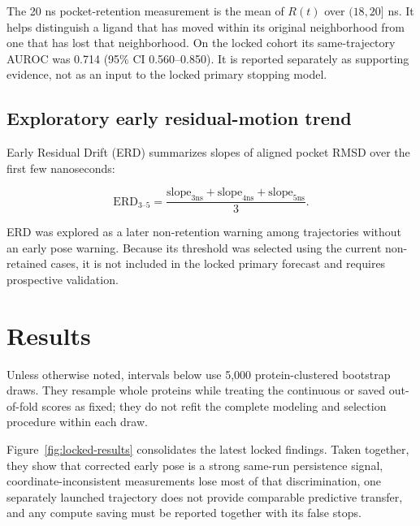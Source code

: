 \documentclass[11pt]{article}
\begin{document}
The 20 ns pocket-retention measurement is the mean of $R(t)$ over $(18,20]$ ns. It helps distinguish a ligand that has moved within its original neighborhood from one that has lost that neighborhood. On the locked cohort its same-trajectory AUROC was 0.714 (95\% CI 0.560--0.850). It is reported separately as supporting evidence, not as an input to the locked primary stopping model.

\subsection{Exploratory early residual-motion trend}

Early Residual Drift (ERD) summarizes slopes of aligned pocket RMSD over the first few nanoseconds:

\begin{equation}
\mathrm{ERD}_{3\text{--}5}=\frac{\mathrm{slope}_{3\mathrm{ns}}+\mathrm{slope}_{4\mathrm{ns}}+\mathrm{slope}_{5\mathrm{ns}}}{3}.
\end{equation}

ERD was explored as a later non-retention warning among trajectories without an early pose warning. Because its threshold was selected using the current non-retained cases, it is not included in the locked primary forecast and requires prospective validation.

\section{Results}
\label{sec:results}

Unless otherwise noted, intervals below use 5,000 protein-clustered bootstrap draws. They resample whole proteins while treating the continuous or saved out-of-fold scores as fixed; they do not refit the complete modeling and selection procedure within each draw.

Figure~\ref{fig:locked-results} consolidates the latest locked findings. Taken together, they show that corrected early pose is a strong same-run persistence signal, coordinate-inconsistent measurements lose most of that discrimination, one separately launched trajectory does not provide comparable predictive transfer, and any compute saving must be reported together with its false stops.
\end{document}
